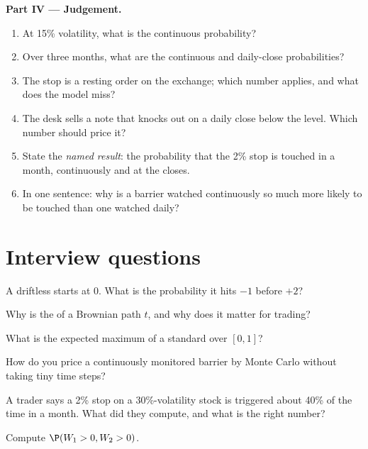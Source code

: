 \begin{problem}
\medskip\noindent\textbf{Part IV --- Judgement.}
\begin{enumerate}[resume]
\item At 15\% volatility, what is the continuous probability?
\item Over three months, what are the continuous and daily-close probabilities?
\item The stop is a resting order on the exchange; which number applies, and what does the model miss?
\item The desk sells a note that knocks out on a daily close below the level. Which number should price it?
\item State the \emph{named result}: the probability that the 2\% stop is touched in a month, continuously and at the closes.
\item In one sentence: why is a barrier watched continuously so much more likely to be touched than one watched daily?
\end{enumerate}
\end{problem}

\section{Interview questions}

\begin{interviewq}\label{iq:qm:brownian-motion:1}
A driftless  starts at 0. What is the probability it hits $-1$ before $+2$?
\end{interviewq}

\begin{interviewq}\label{iq:qm:brownian-motion:2}
Why is the  of a Brownian path $t$, and why does it matter for trading?
\end{interviewq}

\begin{interviewq}\label{iq:qm:brownian-motion:3}
What is the expected maximum of a standard  over $[0,1]$?
\end{interviewq}

\begin{interviewq}\label{iq:qm:brownian-motion:4}
How do you price a continuously monitored barrier by Monte Carlo without taking tiny time steps?
\end{interviewq}

\begin{interviewq}\label{iq:qm:brownian-motion:5}
A trader says a 2\% stop on a 30\%-volatility stock is triggered about 40\% of the time in a
month. What did they compute, and what is the right number?
\end{interviewq}

\begin{interviewq}\label{iq:qm:brownian-motion:6}
Compute $\P(W_1 > 0, W_2 > 0)$.
\end{interviewq}
